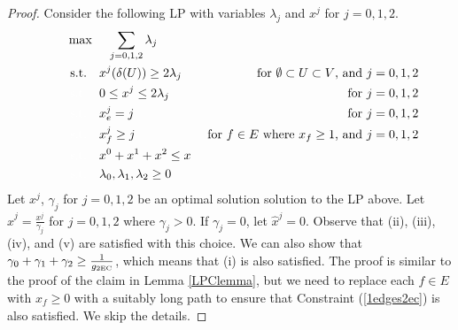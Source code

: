 \documentclass[runningheads]{llncs}
\begin{document}
\begin{proof}
	Consider the following LP with variables $\lambda_j$ and $x^j$ for $j=0,1,2$. 
	\begin{align}
		\quad\quad& \max\quad \;\sum_{j=0,1,2}\lambda_j\\
		&\;\text{s.t.} \quad x^j(\delta(U))\geq 2\lambda_j \;& \mbox{ for $\emptyset \subset U \subset V$, and $j=0,1,2$} \label{feasibility2ec}\\
		&\;{\color{white}{\text{s.t.}} }\quad 0 \leq x^j \leq 2\lambda_j\; &\mbox{ for $j=0,1,2$}\label{bound2ec}\\
		&\;{\color{white}{\text{s.t.}} }\quad x^j_e = j\; &\mbox{ for $j=0,1,2$}\label{branchcoordinate2ec}\\
		&\;{\color{white}{\text{s.t.}} }\quad x^j_f \geq j \; &\mbox{ for $f\in E$ where $x_f \geq 1$, and $j=0,1,2$}\label{1edges2ec}\\
		&\;{\color{white}{\text{s.t.}} }\quad x^0 + x^1+x^2 \leq x\label{packing2ec}\\
		&\;{\color{white}{\text{s.t.}} }\quad \lambda_0,\lambda_1,\lambda_2 \geq 0
	\end{align}	Let $x^j$, $\gamma_j$ for $j=0,1,2$ be an optimal solution solution to the LP above. Let $\hat{x}^{j}=\frac{x^j}{\gamma_j}$ for $j=0,1,2$ where $\gamma_j>0$. If $\gamma_j=0$, let $\hat{x}^{j}=0$. Observe that  (ii), (iii), (iv), and (v) are satisfied with this choice. We can also show that $\gamma_0+\gamma_1+\gamma_2\geq \frac{1}{g_{\operatorname{2EC}}}$, which means that (i) is also satisfied. The proof is similar to the proof of the claim in Lemma \ref{LPClemma}, but we need to replace each $f\in E$ with $x_f\geq 0$ with a suitably long path to ensure that Constraint (\ref{1edges2ec}) is also satisfied.	We skip the details.
\end{proof}
\end{document}
